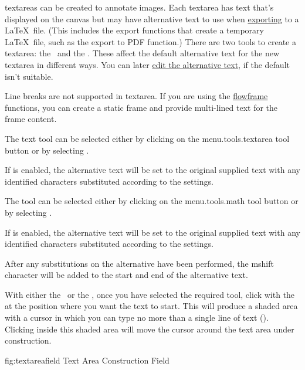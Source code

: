 \Glspl{textarea} can be created to annotate images. Each
\gls*{textarea} has text that's displayed on the \gls{canvas} but
may have alternative text to use when
\hyperref[sec:exportimage]{exporting} to a \LaTeX\ file. (This includes
the export functions that create a temporary \LaTeX\ file, such as
the export to PDF function.) There are two tools to create a
\gls*{textarea}: the \texttool\ and the \mathstool. These
affect the default alternative text for the new \gls*{textarea} in
different ways. You can later \hyperref[sec:edittext]{edit the
alternative text}, if the default isn't suitable.

Line breaks are not supported in \gls{textarea}. If you are using
the \hyperref[sec:flowframe]{flowframe} functions, you can create a
static frame and provide multi-lined text for the frame content.


The text tool can be selected either by clicking on the
\gls{menu.tools.textarea} tool button or by selecting .

If  is enabled, the alternative text will be set
to the original supplied text with any identified characters
substituted according to the  settings.


The  tool can be selected either by clicking on the
\gls{menu.tools.math} tool button or by selecting .

If  is enabled, the alternative text will be set
to the original supplied text with any identified characters
substituted according to the  settings.

After any substitutions on the alternative have been performed, 
the \gls{mshift} character will be added to the start and end
of the alternative text.


With either the \texttool\ or the \mathstool,
once you have selected the required tool, click with the
 at the position where
you want the text to start. This will produce a shaded area with a
cursor in which you can type no more than a single line of text
().
Clicking inside this shaded area will move the cursor around the
text area under construction.

\FloatFig
  {fig:textareafield}
  {}
  {Text Area Construction Field}

